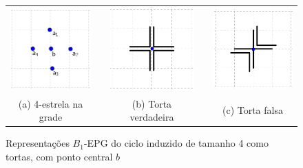 \begin{figure}[htb]
  \centering
  \begin{tabular}{c c c c c }
    \includegraphics[width=3.5cm]{./img/disposicaoTortaGrid.png}    
    & &\includegraphics[width=3.5cm]{./img/truePieGrid.png} 
    & &
 \includegraphics[width=3.5cm]{./img/falsePieGrid.png} \\%
    {\footnotesize (a) 4-estrela na grade}  & &  {\footnotesize (b) Torta verdadeira} & & {\footnotesize (c) Torta falsa} %
  \end{tabular}
  \caption{Representações $B_{1}$-EPG do ciclo induzido de tamanho  4 como tortas, com ponto central $b$}\label{fig:piesInGrid}
\end{figure} 